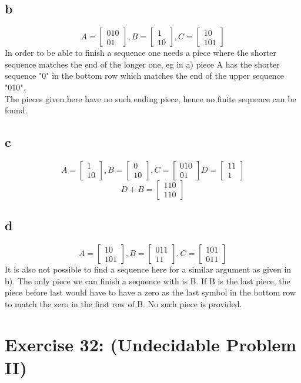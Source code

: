 \documentclass[12pt]{article}
\begin{document}
\subsection*{b}
\[
A =\begin{bmatrix}
0 1 0\\
 0 1  
\end{bmatrix}, 
B = \begin{bmatrix}
 1\\
1 0  
\end{bmatrix},
C = \begin{bmatrix}
 1 0\\
1 0 1
\end{bmatrix}
\]
In order to be able to finish a sequence one needs a piece where the shorter sequence matches the end of the longer one, eg in a) piece A has the shorter sequence "0" in the bottom row which matches the end of the upper sequence "010".\\
The pieces given here have no such ending piece, hence no finite sequence can be found.

\subsection*{c}
\[
A =\begin{bmatrix}
1\\
1 0  
\end{bmatrix}, 
B = \begin{bmatrix}
0\\
1 0  
\end{bmatrix},
C = \begin{bmatrix}
0 1 0\\
0 1
\end{bmatrix}
D = \begin{bmatrix}
1 1\\
1
\end{bmatrix}
\]
\[
D+B =\begin{bmatrix}
1 1  0\\
 1  1 0
\end{bmatrix}
\]


\subsection*{d}
\[
A =\begin{bmatrix}
1 0\\
1 0 1  
\end{bmatrix}, 
B = \begin{bmatrix}
011\\
1 1  
\end{bmatrix},
C = \begin{bmatrix}
1 0 1\\
0 1 1
\end{bmatrix}
\]
It is also not possible to find a sequence here for a similar argument as given in b). The only piece we can finish a sequence with is B. If B is the last piece, the piece before last would have to have a zero as the last symbol in the bottom row to match the zero in the first row of B. No such piece is provided.

\section*{Exercise 32: (Undecidable Problem II)}

\end{document}
